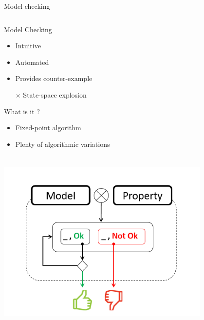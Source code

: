 \documentclass{beamer}
\begin{document}
\begin{frame}{Model checking }

\begin{columns}[t]
\begin{column}{5cm}
\begin{block}{ Model Checking }
\begin{itemize}
\item Intuitive 
\item Automated 
\item Provides counter-example 
\item[$\times$] State-space explosion
\end{itemize}
\end{block}

\begin{block}{What is it ? }
\begin{itemize}
\item Fixed-point algorithm 
\item Plenty of algorithmic variations
\end{itemize}

\end{block}
\end{column}

\begin{column}{5cm}

\end{column}
\end{columns}

\end{frame}

\begin{frame}
\frametitle{}

\includegraphics[width=0.8\textwidth]{Figures/Model-checking.png}



\end{frame}
\end{document}
